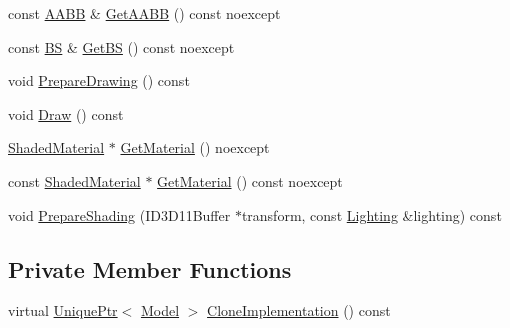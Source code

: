 \begin{DoxyCompactItemize}
\item 
const \hyperlink{structmage_1_1_a_a_b_b}{A\+A\+BB} \& \hyperlink{classmage_1_1_model_a07af22d1e72ffde3ad33b709a8d5c7f4}{Get\+A\+A\+BB} () const noexcept
\item 
const \hyperlink{structmage_1_1_b_s}{BS} \& \hyperlink{classmage_1_1_model_a7d99f18fd9cd6902795f77995b87bea2}{Get\+BS} () const noexcept
\item 
void \hyperlink{classmage_1_1_model_a0083c64e8199db23b78a9281be84685f}{Prepare\+Drawing} () const
\item 
void \hyperlink{classmage_1_1_model_a13badcd5e7bfaf8fbdc447dc211d5ad9}{Draw} () const
\item 
\hyperlink{structmage_1_1_shaded_material}{Shaded\+Material} $\ast$ \hyperlink{classmage_1_1_model_aed33390bd172e034a76fa68093990174}{Get\+Material} () noexcept
\item 
const \hyperlink{structmage_1_1_shaded_material}{Shaded\+Material} $\ast$ \hyperlink{classmage_1_1_model_aa6ba2f2fbcb5aae6c1112f120e5d146c}{Get\+Material} () const noexcept
\item 
void \hyperlink{classmage_1_1_model_a14cc836651dc3eeb378d749b24c149d9}{Prepare\+Shading} (I\+D3\+D11\+Buffer $\ast$transform, const \hyperlink{structmage_1_1_lighting}{Lighting} \&lighting) const
\end{DoxyCompactItemize}
\subsection*{Private Member Functions}
\begin{DoxyCompactItemize}
\item 
virtual \hyperlink{namespacemage_a8c307fbcc33bce9b7f2aa4c26c3b95cf}{Unique\+Ptr}$<$ \hyperlink{classmage_1_1_model}{Model} $>$ \hyperlink{classmage_1_1_model_a4e32ba81c5305dd23dfe760765a5b7d2}{Clone\+Implementation} () const
\end{DoxyCompactItemize}
